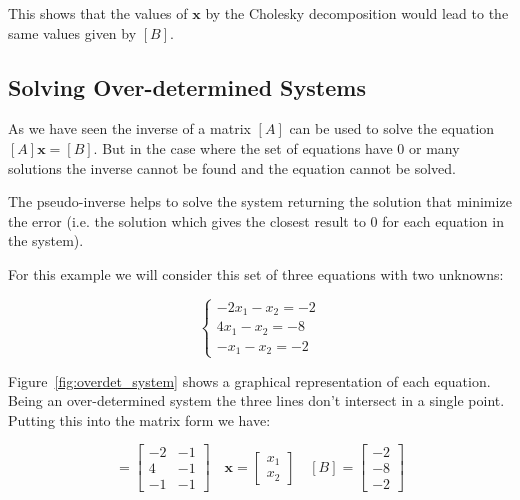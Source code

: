 This shows that the values of $\boldsymbol{x}$ by the Cholesky decomposition would lead to the same values given by $[B]$.

\subsection{Solving Over-determined Systems}
\label{using-the-pseudoinverse-to-solve-a-overdetermined-system-of-linear-equations}

As we have seen the inverse of a matrix $[A]$ can be used to solve the equation $[A]\boldsymbol{x}=[B]$. But in the case where the set of equations have 0 or many solutions the inverse cannot be found and the equation cannot be solved. 

The pseudo-inverse helps to solve the system returning the solution that minimize the error (i.e. the solution which gives the closest result to 0 for each equation in the system). 

For this example we will consider this set of three equations with two unknowns:

\begin{equation*}
\begin{cases}
−2x_1−x_2=−2 \\
4x_1−x_2=−8 \\
−x_1−x_2=−2 
\end{cases}
\end{equation*}


Figure~\ref{fig:overdet_system} shows a graphical representation of each equation. Being an over-determined system the three lines don't intersect in a single point. Putting this into the matrix form we have:

\begin{equation*}
[A]=\begin{bmatrix}
−2&-1\\
4&-1\\
−1&−1\end{bmatrix}\quad 
\boldsymbol{x}=\begin{bmatrix}
x_1\\
x_2\end{bmatrix}\quad
[B]=\begin{bmatrix}
−2\\
−8\\
−2\end{bmatrix}
\end{equation*}

